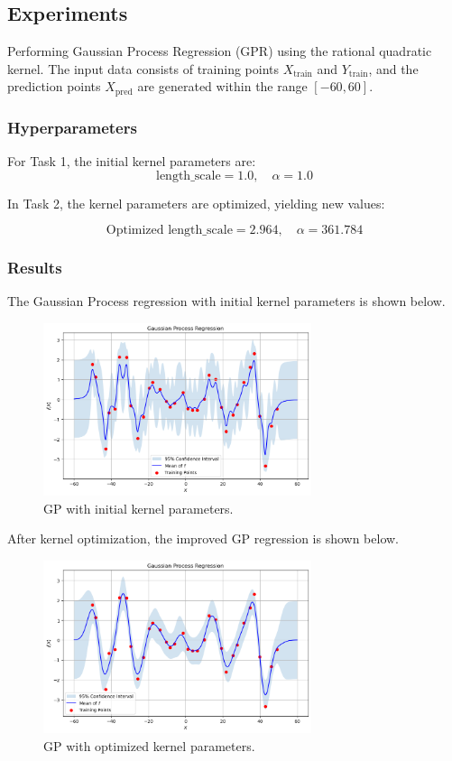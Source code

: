 \documentclass{homework}
\begin{document}
\subsection{Experiments}

Performing Gaussian Process Regression (GPR) using the rational quadratic kernel. The input data consists of training points \(X_{\text{train}}\) and \(Y_{\text{train}}\), and the prediction points \(X_{\text{pred}}\) are generated within the range \([-60, 60]\).

\subsubsection{Hyperparameters}
For Task 1, the initial kernel parameters are:
\[
\text{length\_scale} = 1.0, \quad \alpha = 1.0
\]

In Task 2, the kernel parameters are optimized, yielding new values:

\[
\text{Optimized length\_scale} = \text{2.964}, \quad \alpha = \text{361.784}
\]

\subsubsection{Results}

The Gaussian Process regression with initial kernel parameters is shown below.

\begin{figure}[H]
    \centering
    \includegraphics[width=0.7\textwidth]{gp_plot_task1.png}
    \caption{GP with initial kernel parameters.}
\end{figure}

After kernel optimization, the improved GP regression is shown below.

\begin{figure}[H]
    \centering
    \includegraphics[width=0.7\textwidth]{gp_plot_task2.png}
    \caption{GP with optimized kernel parameters.}
\end{figure}
\end{document}
